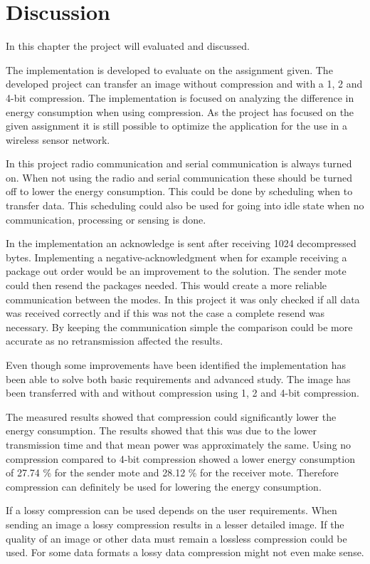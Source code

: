 \chapter{Discussion}
\label{chp:disc}

In this chapter the project will evaluated and discussed.

The implementation is developed to evaluate on the assignment given. The developed project can transfer an image without compression and with a 1, 2 and 4-bit compression. The implementation is focused on analyzing the difference in energy consumption when using compression.  As the project has focused on the given assignment it is still possible to optimize the application for the use in a wireless sensor network.  

In this project radio communication and serial communication is always turned on. When not using the radio and serial communication these should be turned off to lower the energy consumption. This could be done by scheduling when to transfer data. This scheduling could also be used for going into idle state when no communication, processing or sensing is done.

In the implementation an acknowledge is sent after receiving 1024 decompressed bytes. Implementing a negative-acknowledgment when for example receiving a package out order would be an improvement to the solution. The sender mote could then resend the packages needed. This would create a more reliable communication between the modes. In this project it was only checked if all data was received correctly and if this was not the case a complete resend was necessary. By keeping the communication simple the comparison could be more accurate as no retransmission affected the results.

Even though some improvements have been identified the implementation has been able to solve both basic requirements and advanced study. The image has been transferred with and without compression using 1, 2 and 4-bit compression. 

The measured results showed that compression could significantly lower the energy consumption. The results showed that this was due to the lower transmission time and that  mean power was approximately the same. Using no compression compared to 4-bit compression showed a lower energy consumption of 27.74 \% for the sender mote and 28.12 \% for the receiver mote. Therefore compression can definitely be used for lowering the energy consumption.

If a lossy compression can be used depends on the user requirements. When sending an image a lossy compression results in a lesser detailed image. If the quality of an image or other data must remain a lossless compression could be used. For some data formats a lossy data compression might not even make sense.

